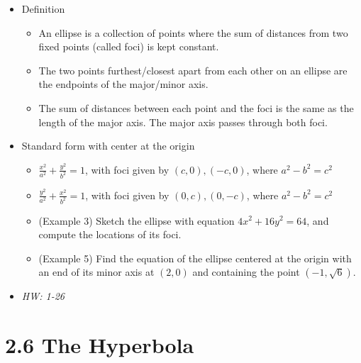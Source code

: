 \documentclass[11pt]{article}
\begin{document}
\begin{itemize}
  \item Definition
    \begin{itemize}
      \item An ellipse is a collection of points where the sum of distances
            from two fixed points (called foci) is kept constant.
      \item The two points furthest/closest apart from each other on an ellipse
            are the endpoints of the major/minor axis.
      \item The sum of distances
            between each point and the foci is the same as the length of
            the major axis. The major axis passes through both foci.
    \end{itemize}
  \item Standard form with center at the origin
    \begin{itemize}
      \item \(\frac{x^2}{a^2}+\frac{y^2}{b^2}=1\), with foci given by
            \((c,0),(-c,0)\), where
            \(a^2-b^2=c^2\)
      \item \(\frac{y^2}{a^2}+\frac{x^2}{b^2}=1\), with foci given by
            \((0,c),(0,-c)\), where
            \(a^2-b^2=c^2\)
      \item (Example 3) Sketch the ellipse with equation \(4x^2+16y^2=64\),
            and compute the locations of its foci.
      \item (Example 5) Find the equation of the ellipse centered at the origin
            with an end of its minor axis at \((2,0)\) and containing the point
            \((-1,\sqrt 6)\).
    \end{itemize}
  \item\textit{
    HW: 1-26
  }
\end{itemize}

\section*{2.6 The Hyperbola}
\end{document}
